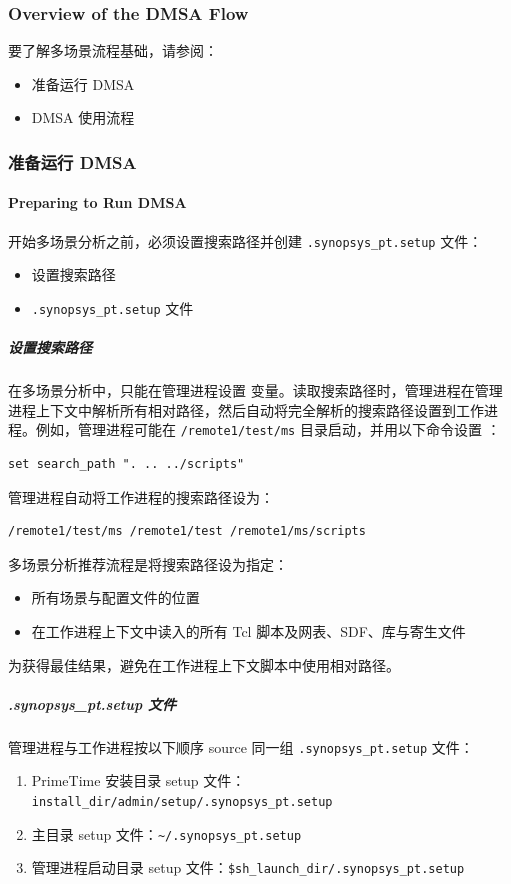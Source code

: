 \subsubsection*{Overview of the DMSA Flow}

要了解多场景流程基础，请参阅：
\begin{itemize}
  \item 准备运行 DMSA
  \item DMSA 使用流程
\end{itemize}

\subsubsection{准备运行 DMSA}
\paragraph*{Preparing to Run DMSA}

开始多场景分析之前，必须设置搜索路径并创建 \texttt{.synopsys\_pt.setup} 文件：
\begin{itemize}
  \item 设置搜索路径
  \item \texttt{.synopsys\_pt.setup} 文件
\end{itemize}

\subparagraph{设置搜索路径}
在多场景分析中，只能在管理进程设置  变量。读取搜索路径时，管理进程在管理进程上下文中解析所有相对路径，然后自动将完全解析的搜索路径设置到工作进程。例如，管理进程可能在 \texttt{/remote1/test/ms} 目录启动，并用以下命令设置 ：
\begin{lstlisting}
set search_path ". .. ../scripts"
\end{lstlisting}
管理进程自动将工作进程的搜索路径设为：
\begin{lstlisting}
/remote1/test/ms /remote1/test /remote1/ms/scripts
\end{lstlisting}

多场景分析推荐流程是将搜索路径设为指定：
\begin{itemize}
  \item 所有场景与配置文件的位置
  \item 在工作进程上下文中读入的所有 Tcl 脚本及网表、SDF、库与寄生文件
\end{itemize}
为获得最佳结果，避免在工作进程上下文脚本中使用相对路径。

\subparagraph{.synopsys\_pt.setup 文件}
管理进程与工作进程按以下顺序 source 同一组 \texttt{.synopsys\_pt.setup} 文件：
\begin{enumerate}
  \item PrimeTime 安装目录 setup 文件：\texttt{install\_dir/admin/setup/.synopsys\_pt.setup}
  \item 主目录 setup 文件：\texttt{\textasciitilde/.synopsys\_pt.setup}
  \item 管理进程启动目录 setup 文件：\texttt{\$sh\_launch\_dir/.synopsys\_pt.setup}
\end{enumerate}

